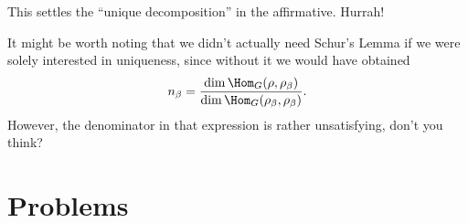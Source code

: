 This settles the ``unique decomposition'' in the affirmative. Hurrah!

It might be worth noting that we didn't actually need Schur's Lemma if we were
solely interested in uniqueness, since without it we would have obtained \[ n_\beta = \frac{\dim \Hom_G(\rho, \rho_\beta)}{\dim \Hom_G(\rho_\beta, \rho_\beta)}. \]
However, the denominator in that expression is rather unsatisfying, don't you think?

\section{Problems}
